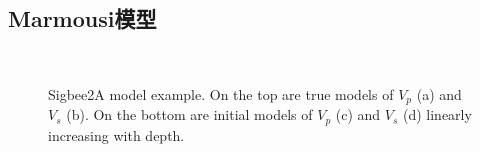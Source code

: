 \subsection{Marmousi模型}
\begin{figure}
   \centering
   \\
   \caption{Sigbee2A model example. On the top are true models of 
   $V_p$ (a) and $V_s$ (b). On the bottom are initial models of $V_p$ (c) and $V_s$
   (d) linearly increasing with depth. }
   \label{fig:TrueAndInitial_1}
\end{figure}
